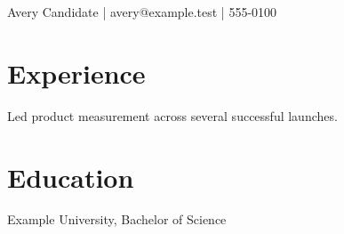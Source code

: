 \documentclass{article}
\begin{document}
Avery Candidate | avery@example.test | 555-0100

\section*{Experience}
Led product measurement across several successful launches.

\section*{Education}
Example University, Bachelor of Science
\end{document}
